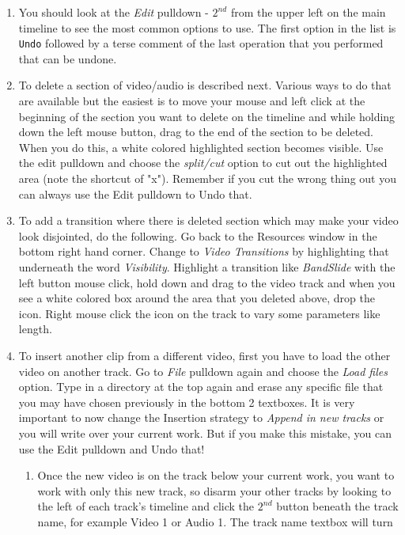 \begin{enumerate}
	\item You should look at the \textit{Edit} pulldown - $2^{nd}$ from the upper left on the main timeline to see the
	most common options to use.  The first option in the list is \texttt{Undo} followed by a terse comment of  
	the last operation that you performed that can be undone.
	\item To delete a section of video/audio is described next.  Various ways to do that are available but the
	easiest is to move your mouse and left click at the beginning of the section you want to delete on the
	timeline and while holding down the left mouse button, drag to the end of the section to be deleted. 
	When you do this, a white colored highlighted section becomes visible.  Use the edit pulldown and
	choose the \textit{split/cut} option to cut out the highlighted area (note the shortcut of "x").  Remember if you
	cut the wrong thing out you can always use the Edit pulldown to Undo that.
	\item To add a transition where there is deleted section which may make your video look disjointed, do
	the following.   Go back to the Resources window in the bottom right hand corner.  Change to
	\textit{Video Transitions} by highlighting that underneath the word \textit{Visibility}.  Highlight a transition like
	\textit{BandSlide} with the left button mouse click, hold down and drag to the video track and when you see
	a white colored box around the area that you deleted above, drop the icon.  Right mouse click the
	icon on the track to vary some parameters like length.
	\item  To insert another clip from a different video, first you have to load the other video on another track.
	Go to \textit{File} pulldown again and choose the \textit{Load files} option.  Type in a directory at the top again and
	erase any specific file that you may have chosen previously in the bottom 2 textboxes.  It is very
	important to now change the Insertion strategy to \textit{Append in new tracks} or you will write over
	your current work.  But if you make this mistake, you can use the Edit pulldown and Undo that!
	\begin{enumerate}
		\item Once the new video is on the track below your current work, you want to work with only this new 
		track, so disarm your other tracks by looking to the left of each track’s timeline and click the $2^{nd}$ 
		button beneath the track name, for example Video 1 or Audio 1.  The track name textbox will turn

\end{enumerate}
\end{enumerate}
